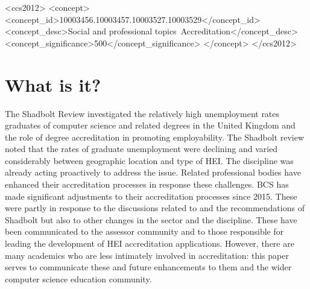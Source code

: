 \documentclass[sigconf]{acmart}
\begin{document}
\begin{CCSXML}
<ccs2012>
<concept>
<concept_id>10003456.10003457.10003527.10003529</concept_id>
<concept_desc>Social and professional topics~Accreditation</concept_desc>
<concept_significance>500</concept_significance>
</concept>
</ccs2012>
\end{CCSXML}




\maketitle
\section {What is it?}
The Shadbolt Review \cite{shadbolt2016shadbolt} investigated the relatively high unemployment rates graduates of computer science and related degrees in the United Kingdom and the role of degree accreditation in promoting employability. The Shadbolt review noted that the rates of graduate unemployment were declining and varied considerably between geographic location and type of HEI. The discipline was already acting proactively to address the issue.  Related professional bodies have enhanced their accreditation processes in response these challenges. BCS has made significant adjustments to their accreditation processes since 2015. These were partly in response to the discussions related to and the recommendations of Shadbolt but also to other changes in the sector and the discipline.  These have been communicated to the assessor community and to those responsible for leading the development of HEI accreditation applications. However, there are many academics who are less intimately involved in accreditation: this paper serves to communicate these and future enhancements to them and the wider computer science education community.
\end{document}
